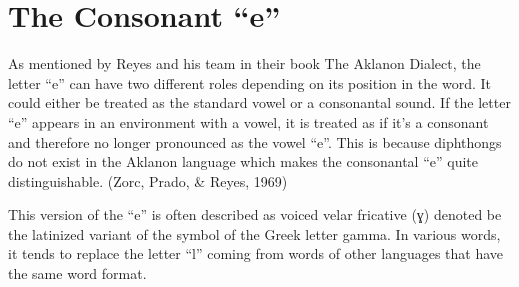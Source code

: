 \section{The Consonant “e”}
As mentioned by Reyes and his team in their book The Aklanon Dialect, the letter “e” can have two different roles depending on its position in the word. It could either be treated as the standard vowel or a consonantal sound. If the letter “e” appears in an environment with a vowel, it is treated as if it’s a consonant and therefore no longer pronounced as the vowel “e”. This is because diphthongs do not exist in the Aklanon language which makes the consonantal “e” quite distinguishable. (Zorc, Prado, & Reyes, 1969)

This version of the “e” is often described as voiced velar fricative (ɣ) denoted be the latinized variant of the symbol of the Greek letter gamma. In various words, it tends to replace the letter “l” coming from words of other languages that have the same word format.
